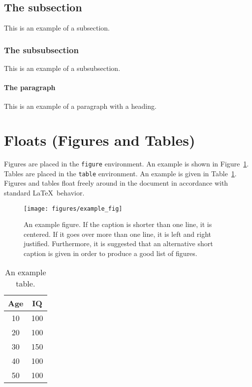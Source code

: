 \subsection{The subsection}

This is an example of a subsection.

\subsubsection{The subsubsection}

This is an example of a subsubsection.

\paragraph{The paragraph}

This is an example of a paragraph with a heading.

\section{Floats (Figures and Tables)}
\label{sec:floats}

Figures are placed in the \texttt{figure} environment. An example is
shown in Figure~\ref{fig:example}. %
Tables are placed in the \texttt{table} environment. An example is given in
Table~\ref{tab:example}. Figures and tables float freely around in the
document in accordance with standard \LaTeX\ behavior.

\begin{figure}[tbp]  %
  \centering
  \texttt{[image: figures/example\_fig]}
  \caption[An example figure.]{An example figure. If the caption is
    shorter than one line, it is centered. If it goes over more than
    one line, it is left and right justified. Furthermore, it is
    suggested that an alternative short caption is given in order to
    produce a good list of figures.}
  \label{fig:example}
\end{figure}

\begin{table}[tbp]
  \centering
  \begin{tabular}{c|c}
    Age  & IQ  \\ 
    \hline
    10   & 100 \\
    20   & 100 \\
    30   & 150 \\
    40   & 100 \\
    50   & 100
  \end{tabular}
  \caption{An example table.}
  \label{tab:example}
\end{table}

